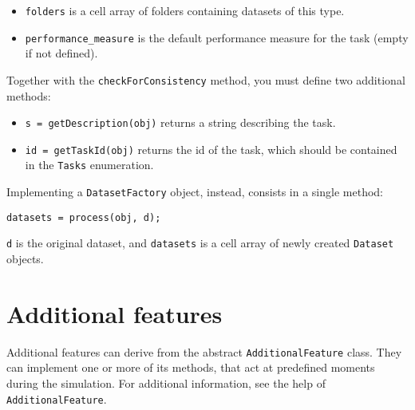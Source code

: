 \begin{itemize}
\item \verb|folders| is a cell array of folders containing datasets of this type.
\item \verb|performance_measure| is the default performance measure for the task (empty if not defined).
\end{itemize}

\noindent Together with the \verb|checkForConsistency| method, you must define two additional methods:

\begin{itemize}
\item \verb|s = getDescription(obj)| returns a string describing the task.
\item \verb|id = getTaskId(obj)| returns the id of the task, which should be contained in the \verb|Tasks| enumeration.
\end{itemize}

\noindent Implementing a \verb|DatasetFactory| object, instead, consists in a single method:

\begin{lstlisting}
datasets = process(obj, d);
\end{lstlisting}

\noindent \verb|d| is the original dataset, and \verb|datasets| is a cell array of newly created \verb|Dataset| objects.

\section{Additional features}

Additional features can derive from the abstract \verb|AdditionalFeature| class. They can implement one or more of its methods, that act at predefined moments during the simulation. For additional information, see the help of \verb|AdditionalFeature|.